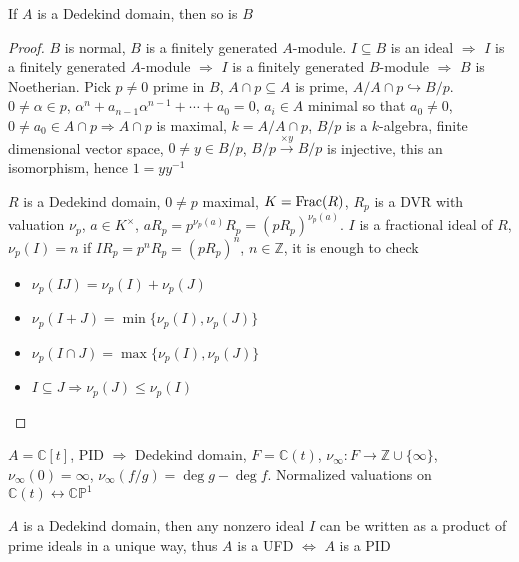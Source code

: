 \documentclass[../main.tex]{subfiles}
\begin{document}
\begin{theorem}
If $A$ is a Dedekind domain, then so is $B$
\begin{center}
\end{center}
\end{theorem}

\begin{proof}
$B$ is normal, $B$ is a finitely generated $A$-module. $I\subseteq B$ is an ideal $\Rightarrow$ $I$ is a finitely generated $A$-module $\Rightarrow$ $I$ is a finitely generated $B$-module $\Rightarrow$ $B$ is Noetherian. Pick $p\neq0$ prime in $B$, $A\cap p\subseteq A$ is prime, $A/A\cap p\hookrightarrow B/p$. $0\neq\alpha\in p$, $\alpha^n+a_{n-1}\alpha^{n-1}+\cdots+a_0=0$, $a_i\in A$ minimal so that $a_0\neq0$, $0\neq a_0\in A\cap p\Rightarrow A\cap p$ is maximal, $k=A/A\cap p$, $B/p$ is a $k$-algebra, finite dimensional vector space, $0\neq y\in B/p$, $B/p\xrightarrow{\times y}B/p$ is injective, this an isomorphism, hence $1=yy^{-1}$ \par 
$R$ is a Dedekind domain, $0\neq p$ maximal, $K=\operatorname{Frac}(R)$, $R_p$ is a DVR with valuation $\nu_p$, $a\in K^\times$, $aR_p=p^{\nu_p(a)}R_p=(pR_p)^{\nu_p(a)}$. $I$ is a fractional ideal of $R$, $\nu_p(I)=n$ if $IR_p=p^nR_p=(pR_p)^n$, $n\in\mathbb Z$, it is enough to check
\begin{itemize}
\item $\nu_p(IJ)=\nu_p(I)+\nu_p(J)$
\item $\nu_p(I+J)=\min\{\nu_p(I),\nu_p(J)\}$
\item $\nu_p(I\cap J)=\max\{\nu_p(I),\nu_p(J)\}$
\item $I\subseteq J\Rightarrow \nu_p(J)\leq \nu_p(I)$
\end{itemize}
\end{proof}

\begin{example}
$A=\mathbb C[t]$, PID $\Rightarrow $ Dedekind domain, $F=\mathbb C(t)$, $\nu_\infty:F\to\mathbb Z\cup\{\infty\}$, $\nu_\infty(0)=\infty$, $\nu_\infty(f/g)=\deg g-\deg f$. Normalized valuations on $\mathbb C(t)\leftrightarrow \mathbb{CP}^1$
\end{example}

\begin{theorem}
$A$ is a Dedekind domain, then any nonzero ideal $I$ can be written as a product of prime ideals in a unique way, thus $A$ is a UFD $\Leftrightarrow$ $A$ is a PID
\end{theorem}
\end{document}
